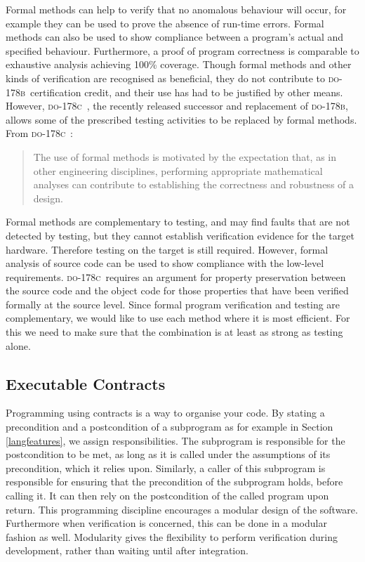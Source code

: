 \documentclass[sttt,final]{svjour}
\newcommand{\DOB}{\textsc{do-178b}}
\newcommand{\DOC}{\textsc{do-178c}}
\begin{document}
Formal methods can help to verify that no anomalous behaviour will
occur, for example they can be used to prove the absence of run-time
errors. Formal methods can also be used to show compliance between a
program's actual and specified behaviour. Furthermore, a proof of
program correctness is comparable to exhaustive analysis achieving
100\% coverage. Though formal methods and other kinds of verification
are recognised as beneficial, they do not contribute to \DOB\
certification credit, and their use has had to be justified by other
means. However, \DOC\ \cite{do178c}, the recently released successor and
replacement of \DOB, allows some of the prescribed testing
activities to be replaced by formal methods. From \DOC\ \cite{do178c}:
%
\begin{quote}
  The use of formal methods is motivated by the expectation that, as
  in other engineering disciplines, performing appropriate
  mathematical analyses can contribute to establishing the correctness
  and robustness of a design.
\end{quote}
%
Formal methods are complementary to testing, and may find faults that
are not detected by testing, but they cannot establish verification
evidence for the target hardware. Therefore testing on the target is
still required. However, formal analysis of source code can be used to
show compliance with the low-level requirements. \DOC\ requires an
argument for property preservation between the source code and the
object code for those properties that have been verified formally at
the source level. Since formal program verification and testing are
complementary, we would like to use each method where it is most
efficient. For this we need to make sure that the combination is at
least as strong as testing alone.

\subsection{Executable Contracts}
Programming using contracts is a way to organise your code. By stating
a precondition and a postcondition of a subprogram as for example in
Section \ref{langfeatures}, we assign responsibilities. The subprogram
is responsible for the postcondition to be met, as long as it is
called under the assumptions of its precondition, which it relies
upon. Similarly, a caller of this subprogram is responsible for ensuring that
the precondition of the subprogram holds, before calling it. It can
then rely on the postcondition of the called program upon return. This
programming discipline encourages a modular design of the
software. Furthermore when verification is concerned, this can be done
in a modular fashion as well. Modularity gives the flexibility to
perform verification during development, rather than waiting until
after integration.
\end{document}

